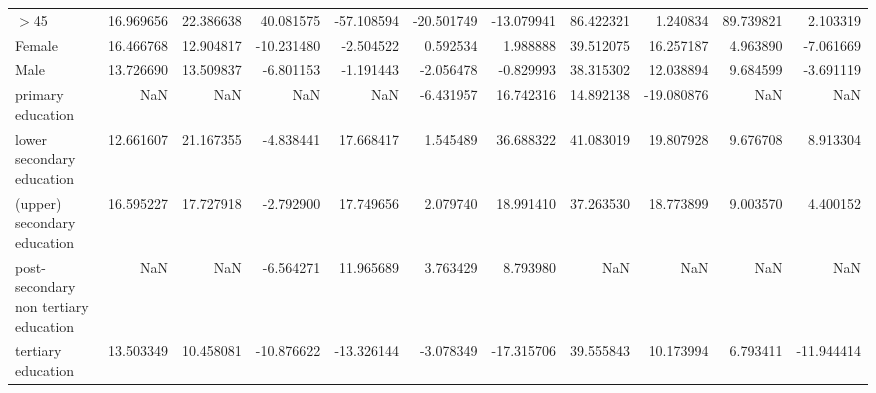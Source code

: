 \documentclass[11pt]{article}
\begin{document}
\begin{table}[!htbp]
{\begin{tabular}{lrrrrrrrrrr}
$>$45                                   &  16.969656 &  22.386638 &  40.081575 & -57.108594 & -20.501749 & -13.079941 &  86.422321 &   1.240834 &  89.739821 &   2.103319 \\
Female                                &  16.466768 &  12.904817 & -10.231480 &  -2.504522 &   0.592534 &   1.988888 &  39.512075 &  16.257187 &   4.963890 &  -7.061669 \\
Male                                  &  13.726690 &  13.509837 &  -6.801153 &  -1.191443 &  -2.056478 &  -0.829993 &  38.315302 &  12.038894 &   9.684599 &  -3.691119 \\
primary education                     &        NaN &        NaN &        NaN &        NaN &  -6.431957 &  16.742316 &  14.892138 & -19.080876 &        NaN &        NaN \\
lower secondary education             &  12.661607 &  21.167355 &  -4.838441 &  17.668417 &   1.545489 &  36.688322 &  41.083019 &  19.807928 &   9.676708 &   8.913304 \\
(upper) secondary education           &  16.595227 &  17.727918 &  -2.792900 &  17.749656 &   2.079740 &  18.991410 &  37.263530 &  18.773899 &   9.003570 &   4.400152 \\
post-secondary non tertiary education &        NaN &        NaN &  -6.564271 &  11.965689 &   3.763429 &   8.793980 &        NaN &        NaN &        NaN &        NaN \\
tertiary education                    &  13.503349 &  10.458081 & -10.876622 & -13.326144 &  -3.078349 & -17.315706 &  39.555843 &  10.173994 &   6.793411 & -11.944414 \\
\bottomrule
\end{tabular}


}
\end{table}
\end{document}
